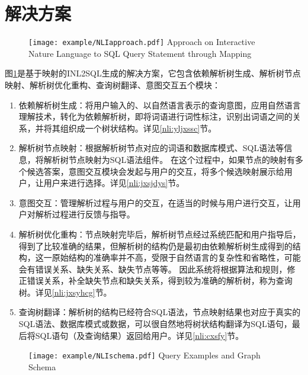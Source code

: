 \section{解决方案}
\begin{figure}[!htp]
    \centering
    \texttt{[image: example/NLIapproach.pdf]}
      {Approach on Interactive Nature Language to SQL Query Statement through Mapping}
    \label{fig:NLIapproach}
  \end{figure}

图\ref{fig:NLIapproach}是基于映射的INL2SQL生成的解决方案，它包含依赖解析树生成、解析树节点映射、解析树优化重构、查询树翻译、意图交互五个模块：
\begin{enumerate}
    \item 依赖解析树生成：将用户输入的、以自然语言表示的查询意图，应用自然语言理解技术，转化为依赖解析树，即将词语进行词性标注，识别出词语之间的关系，并将其组织成一个树状结构。详见\ref{nli:yljxssc}节。
    \item 解析树节点映射：根据解析树节点对应的词语和数据库模式、SQL语法等信息，将解析树节点映射为SQL语法组件。
在这个过程中，如果节点的映射有多个候选答案，意图交互模块会发起与用户的交互，将多个候选映射展示给用户，让用户来进行选择。详见\ref{nli:jxsjdys}节。
    \item 意图交互：管理解析过程与用户的交互，在适当的时候与用户进行交互，让用户对解析过程进行反馈与指导。
    \item 解析树优化重构：节点映射完毕后，解析树节点经过系统匹配和用户指导后，得到了比较准确的结果，但解析树的结构仍是最初由依赖解析树生成得到的结构，这一原始结构的准确率并不高，受限于自然语言的复杂性和省略性，可能会有错误关系、缺失关系、缺失节点等等。
因此系统将根据算法和规则，修正错误关系，补全缺失节点和缺失关系，得到较为准确的解析树，称为查询树。详见\ref{nli:jxsyhcg}节。
    \item 查询树翻译：解析树的结构已经符合SQL语法，节点映射结果也对应于真实的SQL语法、数据库模式或数据，可以很自然地将树状结构翻译为SQL语句，最后将SQL语句（及查询结果）返回给用户。详见\ref{nli:cxsfy}节。
\end{enumerate}

\begin{figure}[!htp]
  \centering
  \texttt{[image: example/NLIschema.pdf]}
    {Query Examples and Graph Schema}
  \label{fig:NLIschema}
\end{figure}

